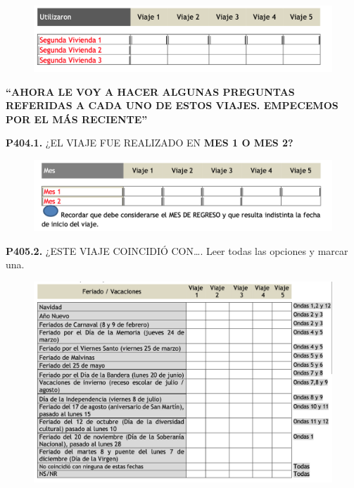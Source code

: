 \documentclass[
  openany]{book}
\begin{document}
\begin{figure}

{\centering \includegraphics[width=1\linewidth]{imagenes/figura6-176} 

}

\end{figure}

\textbf{``AHORA LE VOY A HACER ALGUNAS PREGUNTAS REFERIDAS A CADA UNO DE ESTOS VIAJES. EMPECEMOS POR EL MÁS RECIENTE''}

\textbf{P404.1.} ¿EL VIAJE FUE REALIZADO EN \textbf{MES 1 O MES 2?}

\begin{figure}

{\centering \includegraphics[width=1\linewidth]{imagenes/figura6-177} 

}

\end{figure}

\textbf{P405.2.} ¿ESTE VIAJE COINCIDIÓ CON\ldots.
Leer todas las opciones y marcar una.

\begin{figure}

{\centering \includegraphics[width=1\linewidth]{imagenes/figura6-178} 

}

\end{figure}
\end{document}
